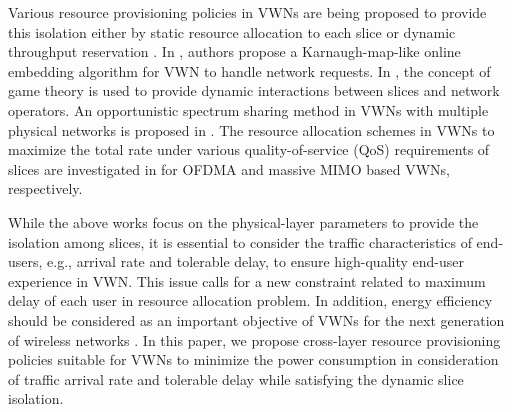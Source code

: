\documentclass[journal,draftclsnofoot,12pt,onecolumn]{IEEEtran}
\begin{document}
Various resource provisioning policies in VWNs are being proposed to provide this isolation either by static resource allocation to each slice or dynamic throughput reservation \cite{6117098}. In \cite{6398722}, authors propose a Karnaugh-map-like online embedding algorithm for VWN to handle network requests. In \cite{6177700}, the concept of game theory is used to provide dynamic interactions between slices and network operators. An opportunistic spectrum sharing method in VWNs with multiple physical networks is proposed in \cite{6952523}. The resource allocation schemes in VWNs to maximize the total rate under various quality-of-service (QoS) requirements of slices are investigated in \cite{7127778,7038181} for OFDMA and massive MIMO based VWNs, respectively.


While the above works focus on the physical-layer parameters to provide the isolation among slices, it is essential to consider the traffic characteristics of end-users, e.g., arrival rate and tolerable delay, to ensure high-quality end-user experience in VWN. This issue calls for a new constraint related to maximum delay of each user in resource allocation problem. In addition, energy efficiency should be considered as an important objective of VWNs for the next generation of wireless networks \cite{6887287}. In this paper, we propose cross-layer resource provisioning policies suitable for VWNs to minimize the power consumption in consideration of traffic arrival rate and tolerable delay while satisfying the dynamic slice isolation.
\end{document}

